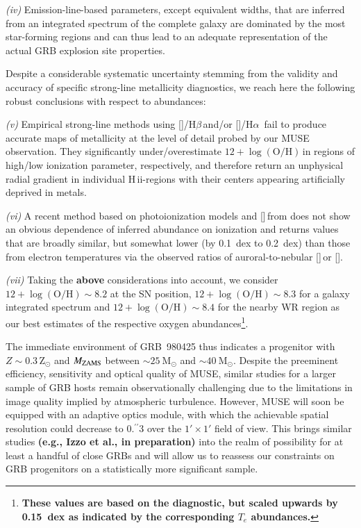 \documentclass[traditabstract, referee]{aa}
\newcommand{\farc}{\hbox{$.\!\!^{\prime\prime}$}}
\newcommand{\hb}{H$\beta$}
\newcommand{\ha}{H$\alpha$}
\newcommand{\hii}{\mbox{H\,{\sc ii}}}
\newcommand{\oh}{12+\log(\mathrm{O/H})}
\newcommand{\sii}{[\ion{S}{ii}]}
\newcommand{\siii}{[\ion{S}{iii}]}
\newcommand{\oiii}{[\ion{O}{iii}]}
\newcommand{\nii}{[\ion{N}{ii}]}
\begin{document}
\textit{(iv)} Emission-line-based parameters, except equivalent widths, that are inferred from an integrated spectrum of the complete galaxy are dominated by the most star-forming regions and can thus lead to an adequate representation of the actual GRB explosion site properties.

Despite a considerable systematic uncertainty stemming from the validity and accuracy of specific strong-line metallicity diagnostics, we reach here the following robust conclusions with respect to abundances:

\textit{(v)} Empirical strong-line methods using \oiii/\hb\,and/or \nii/\ha\, fail to produce accurate maps of metallicity at the level of detail probed by our MUSE observation. They significantly under/overestimate $\oh$\,in regions of high/low ionization parameter, respectively, and therefore return an unphysical radial gradient in individual \hii-regions with their centers appearing artificially deprived in metals.

\textit{(vi)} A recent method based on photoionization models and \sii\,from \citet{2016Ap&SS.361...61D} does not show an obvious dependence of inferred abundance on ionization and returns values that are broadly similar, but somewhat lower (by 0.1~dex to 0.2~dex) than those from electron temperatures via the observed ratios of auroral-to-nebular \siii\,or \oiii. 

\textit{(vii)} Taking the \textbf{above} considerations into account, we consider \textbf{$\oh\sim8.2$} at the SN position, $\oh\sim8.3$ for a galaxy integrated spectrum and $\oh\sim8.4$ for the nearby WR region as our best estimates of the respective oxygen abundances\footnote{\textbf{These values are based on the \citet{2016Ap&SS.361...61D} diagnostic, but scaled upwards by 0.15~dex as indicated by the corresponding $T_e$ abundances.}}.

The immediate environment of GRB~980425 thus indicates a progenitor with $Z\sim0.3\,\mathrm{Z}_\odot$ and $M_{\rm{ZAMS}}$ between $\sim25~\mathrm{M}_{\odot}$ and $\sim40~\mathrm{M}_{\odot}$. Despite the preeminent efficiency, sensitivity and optical quality of MUSE, similar studies for a larger sample of GRB hosts remain observationally challenging due to the limitations in image quality implied by atmospheric turbulence. However, MUSE will soon be equipped with an adaptive optics module, with which the achievable spatial resolution could decrease to 0\farc{3} over the $1'\times1'$ field of view. This brings similar studies \textbf{(e.g., Izzo et al., in preparation)} into the realm of possibility for at least a handful of close GRBs and will allow us to reassess our constraints on GRB progenitors on a statistically more significant sample.
\end{document}
